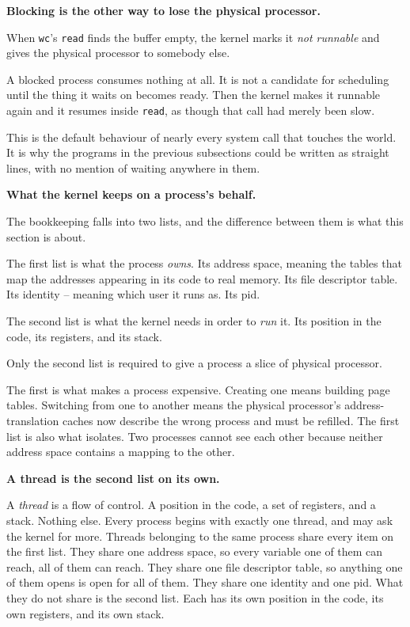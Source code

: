 \documentclass[11pt,a4paper]{article}
\begin{document}
\textbf{Blocking is the other way to lose the physical processor.}

When \texttt{wc}'s \texttt{read} finds the buffer empty, the kernel marks it \emph{not runnable}
and gives the physical processor to somebody else.

A blocked process consumes nothing at all. It
is not a candidate for scheduling until the thing it waits on becomes ready. Then the kernel makes
it runnable again and it resumes inside \texttt{read}, as though that call had merely been slow.

This is the default behaviour of nearly every system call that touches the world. It is why the
programs in the previous subsections could be written as straight lines, with no mention of waiting
anywhere in them.

\textbf{What the kernel keeps on a process's behalf.}

The bookkeeping falls into two lists, and the difference between them is what this section is
about.

The first list is what the process \emph{owns}. Its address space, meaning the tables that map the
addresses appearing in its code to real memory. Its file descriptor table. Its identity -- meaning
which user it runs as. Its pid.

The second list is what the kernel needs in order to \emph{run} it. Its position in the code, its
registers, and its stack.

Only the second list is required to give a process a slice of physical processor.

The first is what makes a
process expensive. Creating one means building page tables. Switching from one to another means the
physical processor's address-translation caches now describe the wrong process and must be refilled. The
first list is also what isolates. Two processes cannot see each other because neither address space
contains a mapping to the other.

\textbf{A thread is the second list on its own.}

A \emph{thread} is a flow of control. A position in the code, a set of registers, and a stack.
Nothing else. Every process begins with exactly one thread, and may ask the kernel for more.
Threads belonging to the same process share every item on the first list. They share one address
space, so every variable one of them can reach, all of them can reach. They share one file
descriptor table, so anything one of them opens is open for all of them. They share one identity
and one pid. What they do not share is the second list. Each has its own position in the code, its
own registers, and its own stack.
\end{document}
